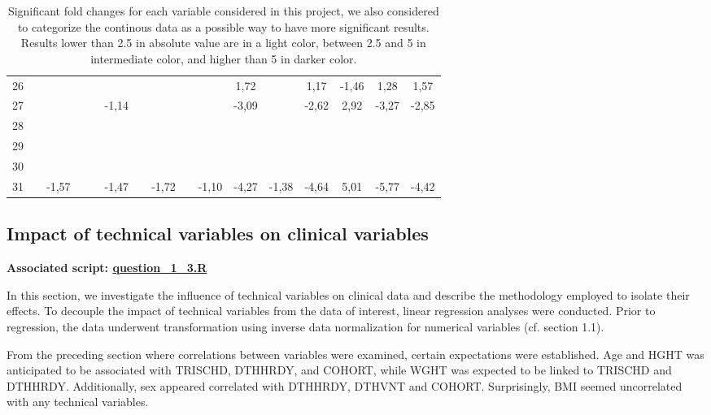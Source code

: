 \documentclass[a4paper, 11pt]{article}
\begin{document}
\begin{multicols}{2}
\begin{table}[h]
{\begin{tabular}{|c|c c|c|c c|c c|c c|c|c c|c|cc|}
26 &  &  &  &  &  &  &  &  &  & \cellcolor[HTML]{FDFF89}1,72 &  & \cellcolor[HTML]{FDFF89}1,17 & \cellcolor[HTML]{B4F5F2}-1,46 & \cellcolor[HTML]{FDFF89}1,28 & \cellcolor[HTML]{FDFF89}1,57 \\
27 &  &  &  &  & \cellcolor[HTML]{B4F5F2}-1,14 &  &  &  &  & \cellcolor[HTML]{4AD7FF}-3,09 &  & \cellcolor[HTML]{4AD7FF}-2,62 & \cellcolor[HTML]{FFC702}2,92 & \cellcolor[HTML]{4AD7FF}-3,27 & \cellcolor[HTML]{4AD7FF}-2,85 \\
28 &  &  &  &  &  &  &  &  &  &  &  &  &  &  &  \\
29 &  &  &  &  &  &  &  &  &  &  &  &  &  &  &  \\
30 &  &  &  &  &  &  &  &  &  &  &  &  &  &  &  \\
31 &  & \cellcolor[HTML]{B4F5F2}-1,57 &  &  & \cellcolor[HTML]{B4F5F2}-1,47 &  & \cellcolor[HTML]{B4F5F2}-1,72 &  & \cellcolor[HTML]{B4F5F2}-1,10 & \cellcolor[HTML]{4AD7FF}-4,27 & \cellcolor[HTML]{B4F5F2}-1,38 & \cellcolor[HTML]{4AD7FF}-4,64 & \cellcolor[HTML]{F56B00}5,01 & \cellcolor[HTML]{6F94FF}-5,77 & \cellcolor[HTML]{4AD7FF}-4,42 \\
\hline
\end{tabular}}
\caption{Significant fold changes for each variable considered in this project, we also considered to categorize the continous data as a possible way to have more significant results. Results lower than 2.5 in absolute value are in a light color, between 2.5 and 5 in intermediate color, and higher than 5 in darker color.}
\label{tab:Q2FC}
\end{table}

\subsection{Impact of technical variables on clinical variables}
\begin{scriptsize}	
	\textbf{Associated script: \href{https://github.com/leopoldguyot/BINF-F401-Project/blob/main/question_1_3.R}{question\_1\_3.R}}
\end{scriptsize}

In this section, we investigate the influence of technical variables on clinical data and describe the methodology employed to isolate their effects.
To decouple the impact of technical variables from the data of interest, linear regression analyses were conducted.
Prior to regression, the data underwent transformation using inverse data normalization for numerical variables (cf. section 1.1).

From the preceding section where correlations between variables were examined, certain expectations were established.
Age and HGHT was anticipated to be associated with TRISCHD, DTHHRDY, and COHORT, while WGHT was expected to be linked to TRISCHD and DTHHRDY.
Additionally, sex appeared correlated with DTHHRDY, DTHVNT and COHORT. Surprisingly, BMI seemed uncorrelated with any technical variables.


\end{multicols}
\end{document}
